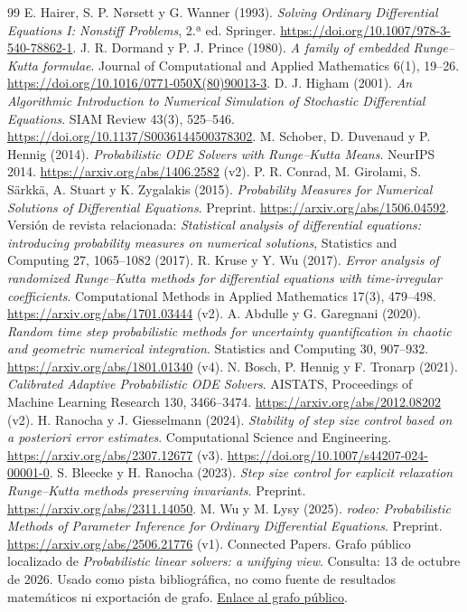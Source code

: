 \documentclass[11pt,a4paper]{article}
\theoremstyle{definition}\newtheorem{definition}[theorem]{Definición}
\theoremstyle{remark}\newtheorem{remark}[theorem]{Observación}
\begin{document}
\clearpage
\renewcommand{\refname}{Referencias verificables}
{}
\small
\begin{thebibliography}{99}
 E. Hairer, S. P. Nørsett y G. Wanner (1993).
\emph{Solving Ordinary Differential Equations I: Nonstiff Problems}, 2.ª ed.
Springer. \url{https://doi.org/10.1007/978-3-540-78862-1}.
 J. R. Dormand y P. J. Prince (1980).
\emph{A family of embedded Runge--Kutta formulae}.
Journal of Computational and Applied Mathematics 6(1), 19--26.
\url{https://doi.org/10.1016/0771-050X(80)90013-3}.
 D. J. Higham (2001).
\emph{An Algorithmic Introduction to Numerical Simulation of Stochastic Differential Equations}.
SIAM Review 43(3), 525--546.
\url{https://doi.org/10.1137/S0036144500378302}.
 M. Schober, D. Duvenaud y P. Hennig (2014).
\emph{Probabilistic ODE Solvers with Runge--Kutta Means}.
NeurIPS 2014. \url{https://arxiv.org/abs/1406.2582} (v2).
 P. R. Conrad, M. Girolami, S. Särkkä, A. Stuart y K. Zygalakis (2015).
\emph{Probability Measures for Numerical Solutions of Differential Equations}.
Preprint. \url{https://arxiv.org/abs/1506.04592}.
Versión de revista relacionada: \emph{Statistical analysis of differential equations:
introducing probability measures on numerical solutions}, Statistics and Computing
27, 1065--1082 (2017).
 R. Kruse y Y. Wu (2017).
\emph{Error analysis of randomized Runge--Kutta methods for differential equations with time-irregular coefficients}.
Computational Methods in Applied Mathematics 17(3), 479--498.
\url{https://arxiv.org/abs/1701.03444} (v2).
 A. Abdulle y G. Garegnani (2020).
\emph{Random time step probabilistic methods for uncertainty quantification in chaotic and geometric numerical integration}.
Statistics and Computing 30, 907--932.
\url{https://arxiv.org/abs/1801.01340} (v4).
 N. Bosch, P. Hennig y F. Tronarp (2021).
\emph{Calibrated Adaptive Probabilistic ODE Solvers}.
AISTATS, Proceedings of Machine Learning Research 130, 3466--3474.
\url{https://arxiv.org/abs/2012.08202} (v2).
 H. Ranocha y J. Giesselmann (2024).
\emph{Stability of step size control based on a posteriori error estimates}.
Computational Science and Engineering.
\url{https://arxiv.org/abs/2307.12677} (v3).
\url{https://doi.org/10.1007/s44207-024-00001-0}.
 S. Bleecke y H. Ranocha (2023).
\emph{Step size control for explicit relaxation Runge--Kutta methods preserving invariants}.
Preprint. \url{https://arxiv.org/abs/2311.14050}.
 M. Wu y M. Lysy (2025).
\emph{rodeo: Probabilistic Methods of Parameter Inference for Ordinary Differential Equations}.
Preprint. \url{https://arxiv.org/abs/2506.21776} (v1).
 Connected Papers. Grafo público localizado de
\emph{Probabilistic linear solvers: a unifying view}.
Consulta: 13 de octubre de 2026. Usado como pista bibliográfica, no como
fuente de resultados matemáticos ni exportación de grafo.
\href{https://www.connectedpapers.com/main/ee71541a36a170d0fafb881faf661e00f4df9a48/Probabilistic-linear-solvers:-a-unifying-view/graph}{Enlace al grafo público}.
\end{thebibliography}
\end{document}

